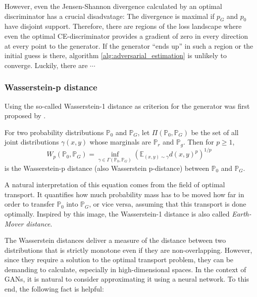 However, even the Jensen-Shannon divergence calculated by an optimal discriminator has a crucial disadvatage:
The divergence is maximal if $p_G$ and $p_0$ have disjoint support. %
Therefore, there are regions of the loss landscape where even the optimal CE-discriminator provides a gradient of zero in every direction at every point to the generator.
If the generator ``ends up'' in such a region or the initial guess is there, algorithm \ref{alg:adversarial_estimation} is unlikely to converge.
Luckily, there are $\cdots$

\subsubsection{Wasserstein-p distance}
\label{sec:wasserstein_loss}

Using the so-called Wasserstein-1 distance as criterion for the generator was first proposed by \Textcite{arjovsky2017wassersteingan}.%

\begin{definition}
    For two probability distributions $\mathbb{P}_0$ and $\mathbb{P}_G$, let $\Pi (\mathbb{P}_0, \mathbb{P}_G)$ be the set of all joint distributions $\gamma(x, y)$ whose marginals are $\mathbb{P}_r$ and $\mathbb{P}_g$.
    Then for $p \geq 1$,%
    $$
    W_p(\mathbb{P}_0, \mathbb{P}_G) = \inf_{\gamma \in \Gamma(\mathbb{P}_0, \mathbb{P}_G)} \left(\mathbb{E}_{(x, y) \sim \gamma} d(x, y)^p \right)^{1/p}
    $$
    is the Wasserstein-p distance (also Wasserstein p-distance) between $\mathbb{P}_0$ and $\mathbb{P}_G$.
\end{definition}

A natural interpretation of this equation comes from the field of optimal transport.
It quantifies how much probability mass has to be moved how far in order to transfer $\mathbb{P}_0$ into $\mathbb{P}_G$, or vice versa, assuming that this transport is done optimally.
Inspired by this image, the Wasserstein-1 distance is also called \textit{Earth-Mover distance}.

The Wasserstein distances deliver a measure of the distance between two distributions that is strictly monotone even if they are non-overlapping. %
However, since they require a solution to the optimal transport problem, they can be demanding to calculate, especially in high-dimensional spaces. %
In the context of GANs, it is natural to consider approximating it using a neural network.
To this end, the following fact is helpful:

